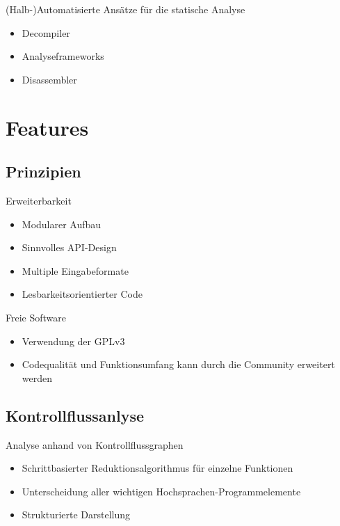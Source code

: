 \documentclass{beamer}
\begin{document}
\begin{frame}{(Halb-)Automatisierte Ansätze für die statische Analyse}
  \begin{itemize}
  \item Decompiler
  \item Analyseframeworks
  \item Disassembler
  \end{itemize}
\end{frame}

\section{Features}

\subsection{Prinzipien}

\begin{frame}{Erweiterbarkeit}
  \begin{itemize}
  \item Modularer Aufbau
  \item Sinnvolles API-Design
  \item Multiple Eingabeformate
  \item Lesbarkeitsorientierter Code
  \end{itemize}
\end{frame}

\begin{frame}{Freie Software}
  \begin{itemize}
  \item Verwendung der GPLv3
  \item Codequalität und Funktionsumfang kann durch die Community erweitert werden
  \end{itemize}
\end{frame}

\subsection{Kontrollflussanlyse}

\begin{frame}{Analyse anhand von Kontrollflussgraphen}
  \begin{itemize}
  \item Schrittbasierter Reduktionsalgorithmus für einzelne Funktionen
  \item Unterscheidung aller wichtigen Hochsprachen-Programmelemente
  \item Strukturierte Darstellung
  \end{itemize}
\end{frame}
\end{document}

